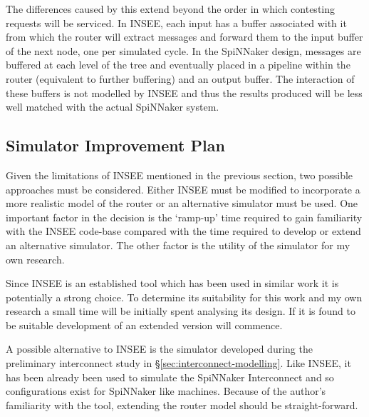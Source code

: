 			The differences caused by this extend beyond the order in which contesting
			requests will be serviced. In INSEE, each input has a buffer associated
			with it from which the router will extract messages and forward them to
			the input buffer of the next node, one per simulated cycle. In the
			SpiNNaker design, messages are buffered at each level of the tree and
			eventually placed in a pipeline within the router (equivalent to further
			buffering) and an output buffer. The interaction of these buffers is not
			modelled by INSEE and thus the results produced will be less well matched
			with the actual SpiNNaker system.
			
		
		\subsection{Simulator Improvement Plan}
			
			\label{sec:simulator-improvement-plan}
			
			Given the limitations of INSEE mentioned in the previous section, two
			possible approaches must be considered. Either INSEE must be modified to
			incorporate a more realistic model of the router or an alternative
			simulator must be used.  One important factor in the decision is the
			`ramp-up' time required to gain familiarity with the INSEE code-base
			compared with the time required to develop or extend an alternative
			simulator. The other factor is the utility of the simulator for my own
			research.
			
			Since INSEE is an established tool which has been used in similar work it
			is potentially a strong choice. To determine its suitability for this work
			and my own research a small time will be initially spent analysing its
			design. If it is found to be suitable development of an extended version
			will commence.
			
			A possible alternative to INSEE is the simulator developed during the
			preliminary interconnect study in \S\ref{sec:interconnect-modelling}.
			Like INSEE, it has been already been used to simulate the SpiNNaker
			Interconnect and so configurations exist for SpiNNaker like machines.
			Because of the author's familiarity with the tool, extending the router
			model should be straight-forward.
	
